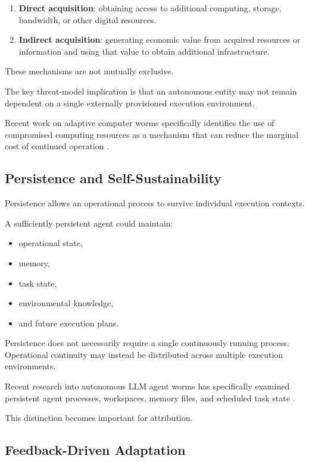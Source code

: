 \documentclass[11pt,a4paper]{article}
\begin{document}
\begin{enumerate}
    \item \textbf{Direct acquisition}: obtaining access to additional
    computing, storage, bandwidth, or other digital resources.

    \item \textbf{Indirect acquisition}: generating economic value from
    acquired resources or information and using that value to obtain
    additional infrastructure.
\end{enumerate}

These mechanisms are not mutually exclusive.

The key threat-model implication is that an autonomous entity may not remain
dependent on a single externally provisioned execution environment.

Recent work on adaptive computer worms specifically identifies the use of
compromised computing resources as a mechanism that can reduce the marginal
cost of continued operation \cite{R1}.

\subsection{Persistence and Self-Sustainability}

Persistence allows an operational process to survive individual execution
contexts.

A sufficiently persistent agent could maintain:

\begin{itemize}
    \item operational state,
    \item memory,
    \item task state,
    \item environmental knowledge,
    \item and future execution plans.
\end{itemize}

Persistence does not necessarily require a single continuously running
process. Operational continuity may instead be distributed across multiple
execution environments.

Recent research into autonomous LLM agent worms has specifically examined
persistent agent processes, workspaces, memory files, and scheduled task
state \cite{R3}.

This distinction becomes important for attribution.

\subsection{Feedback-Driven Adaptation}
\end{document}
